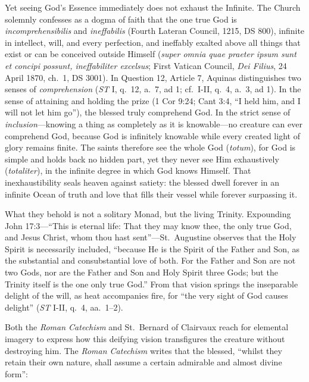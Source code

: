 Yet seeing God's Essence immediately does not exhaust the Infinite. The Church solemnly confesses as a dogma of faith that the one true God is \textit{incomprehensibilis} and \textit{ineffabilis} (Fourth Lateran Council, 1215, DS 800), infinite in intellect, will, and every perfection, and ineffably exalted above all things that exist or can be conceived outside Himself (\textit{super omnia quae praeter ipsum sunt et concipi possunt, ineffabiliter excelsus}; First Vatican Council, \textit{Dei Filius}, 24 April 1870, ch.\ 1, DS 3001). In Question 12, Article 7, Aquinas distinguishes two senses of \textit{comprehension} (\textit{ST} I, q.\ 12, a.\ 7, ad 1; cf.\ I-II, q.\ 4, a.\ 3, ad 1). In the sense of attaining and holding the prize (1 Cor 9:24; Cant 3:4, ``I held him, and I will not let him go''), the blessed truly comprehend God. In the strict sense of \textit{inclusion}---knowing a thing as completely as it is knowable---no creature can ever comprehend God, because God is infinitely knowable while every created light of glory remains finite. The saints therefore see the whole God (\textit{totum}), for God is simple and holds back no hidden part, yet they never see Him exhaustively (\textit{totaliter}), in the infinite degree in which God knows Himself. That inexhaustibility seals heaven against satiety: the blessed dwell forever in an infinite Ocean of truth and love that fills their vessel while forever surpassing it.

What they behold is not a solitary Monad, but the living Trinity. Expounding John 17:3---``This is eternal life: That they may know thee, the only true God, and Jesus Christ, whom thou hast sent''---St.\ Augustine observes that the Holy Spirit is necessarily included, ``because He is the Spirit of the Father and Son, as the substantial and consubstantial love of both. For the Father and Son are not two Gods, nor are the Father and Son and Holy Spirit three Gods; but the Trinity itself is the one only true God.'' From that vision springs the inseparable delight of the will, as heat accompanies fire, for ``the very sight of God causes delight'' (\textit{ST} I-II, q.\ 4, aa.\ 1--2).

Both the \textit{Roman Catechism} and St.\ Bernard of Clairvaux reach for elemental imagery to express how this deifying vision transfigures the creature without destroying him. The \textit{Roman Catechism} writes that the blessed, ``whilst they retain their own nature, shall assume a certain admirable and almost divine form'':

